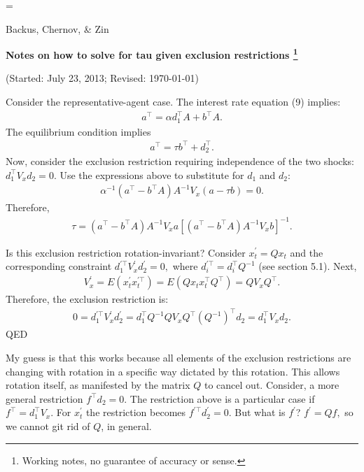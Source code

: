 \documentclass[11pt]{article}
\begin{document}
\parskip=\bigskipamount
\parindent=0.0in
\thispagestyle{empty}
\begin{flushright} Backus, Chernov, \& Zin \end{flushright}

\bigskip
\centerline{\Large \bf Notes on how to solve for tau given exclusion restrictions%
\footnote{Working notes, no guarantee of accuracy or sense.}}
\centerline{(Started: July 23, 2013; Revised: \today)}


Consider the representative-agent case. The interest rate equation (9) implies:
\begin{eqnarray*}
   a^{\top}=\alpha d_1^{\top}A+b^{\top}A.
\end{eqnarray*}
The equilibrium condition implies
\begin{eqnarray*}
      a^{\top}=\tau b^{\top} +d_2^{\top}.
\end{eqnarray*} 
Now, consider the exclusion restriction requiring independence of the two shocks: $d_1^{\top} V_x d_2=0.$ Use the expressions above to substitute for $d_1$ and $d_2:$
\begin{eqnarray*}
    \alpha^{-1}(a^{\top}-b^{\top}A)A^{-1} V_x (a-\tau b)=0.
\end{eqnarray*}
Therefore,
\begin{eqnarray*}
    \tau = (a^{\top}-b^{\top}A)A^{-1} V_x a  [(a^{\top}-b^{\top}A)A^{-1} V_x b]^{-1}.
\end{eqnarray*}

Is this exclusion restriction rotation-invariant? Consider $x_t^{\prime}=Qx_t$ and the corresponding constraint  $d_1^{\prime \top} V_x^{\prime} d_2^{\prime}=0,$ where $d_i^{\prime \top} = d_i^{\top}Q^{-1}$ (see section 5.1).
Next,
\begin{eqnarray*}
    V_x^{\prime}=E(x_t^{\prime}x_t^{\prime\top})=E(Qx_tx_t^{\top}Q^{\top})=QV_xQ^{\top}. 
\end{eqnarray*}
Therefore, the exclusion restriction is:
\begin{eqnarray*}
    0=d_1^{\prime \top} V_x^{\prime} d_2^{\prime}=d_1^{\top}Q^{-1} QV_xQ^{\top} (Q^{-1})^{\top} d_2 = d_1^{\top} V_x d_2.
\end{eqnarray*}
QED

My guess is that this works because all elements of the exclusion restrictions are changing with rotation in a specific way dictated by this rotation. This allows rotation itself, as manifested by the matrix $Q$ to cancel out. Consider, a more general restriction $f^{\top}d_2=0$. The restriction above is a particular case if $f^{\top}=d_1^{\top} V_x.$ For $x^{\prime}_t$ the restriction becomes $f^{\prime \top}d_2^{\prime}=0.$ But what is $f^{\prime}$? $f^{\prime}=Qf,$ so we cannot git rid of $Q$, in general.
\end{document}
